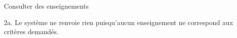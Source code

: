 \begin{ocl}
\begin{usecase}{Consulter des enseignements}
 \begin{extension}
 \item [2a.] Le système ne renvoie rien puisqu'aucun enseignement ne correspond aux critères demandés.
 \end{extension}
\end{usecase}

\end{ocl}
